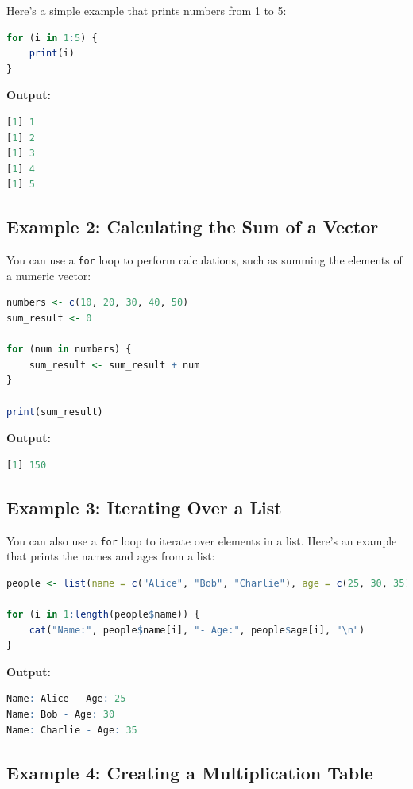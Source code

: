 \documentclass[10pt]{book}
\begin{document}
Here's a simple example that prints numbers from 1 to 5:

\begin{lstlisting}[language=R]
for (i in 1:5) {
    print(i)
}
\end{lstlisting}

\textbf{Output:}
\begin{lstlisting}[language=R]
[1] 1
[1] 2
[1] 3
[1] 4
[1] 5
\end{lstlisting}

\subsection{Example 2: Calculating the Sum of a Vector}

You can use a \texttt{for} loop to perform calculations, such as summing the elements of a numeric vector:

\begin{lstlisting}[language=R]
numbers <- c(10, 20, 30, 40, 50)
sum_result <- 0

for (num in numbers) {
    sum_result <- sum_result + num
}

print(sum_result)
\end{lstlisting}

\textbf{Output:}
\begin{lstlisting}[language=R]
[1] 150
\end{lstlisting}

\subsection{Example 3: Iterating Over a List}

You can also use a \texttt{for} loop to iterate over elements in a list. Here’s an example that prints the names and ages from a list:

\begin{lstlisting}[language=R]
people <- list(name = c("Alice", "Bob", "Charlie"), age = c(25, 30, 35))

for (i in 1:length(people$name)) {
    cat("Name:", people$name[i], "- Age:", people$age[i], "\n")
}
\end{lstlisting}

\textbf{Output:}
\begin{lstlisting}[language=R]
Name: Alice - Age: 25 
Name: Bob - Age: 30 
Name: Charlie - Age: 35 
\end{lstlisting}

\subsection{Example 4: Creating a Multiplication Table}
\end{document}

